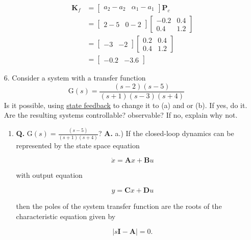 \documentclass[main.tex]{subfiles}
\begin{document}
\begin{enumerate}
\begin{enumerate}
        $$
        \begin{aligned}
        \textbf{K}_f & =\left[\begin{array}{ll}
        a_2-a_2 & \alpha_1-a_1
        \end{array}\right] \textbf{P}_c \\
        & =\left[\begin{array}{ll}
        2-5 & 0-2
        \end{array}\right]\left[\begin{array}{cc}
        -0.2 & 0.4 \\
        0.4 & 1.2
        \end{array}\right] \\
        & =\left[\begin{array}{ll}
        -3 & -2
        \end{array}\right]\left[\begin{array}{ll}
        0.2 & 0.4 \\
        0.4 & 1.2
        \end{array}\right] \\
        & =\left[\begin{array}{ll}
        -0.2 & -3.6
        \end{array}\right]
        \end{aligned}
        $$
	\end{enumerate}
	
\item [6.] Consider a system with a transfer function 
$$\mathrm{G}(s)=\frac{(s-2)(s-5)}{(s+1)(s-3)(s+4)}$$
Is it possible, using \underline{state feedback} to change it to (a) and or (b). If yes, do it. Are the resulting systems controllable? observable? If no, explain why not.

\begin{enumerate}
    \item \textbf{Q.} $\mathrm{G}(s)=\frac{(s-5)}{(s+1)(s+4)}$?
    \textbf{A.} a.) If the closed-loop dynamics can be represented by the state space equation 
    
    $$\dot{x} = \mathbf{A} x + \mathbf{B} u$$
    
    with output equation 
    
    $$y = \mathbf{C} x + \mathbf{D} u$$ 
    
    then the poles of the system transfer function are the roots of the characteristic equation given by 
    
    $$|s \mathbf{I}-\mathbf{A}|=0.$$ 
    

\end{enumerate}
\end{enumerate}
\end{document}
